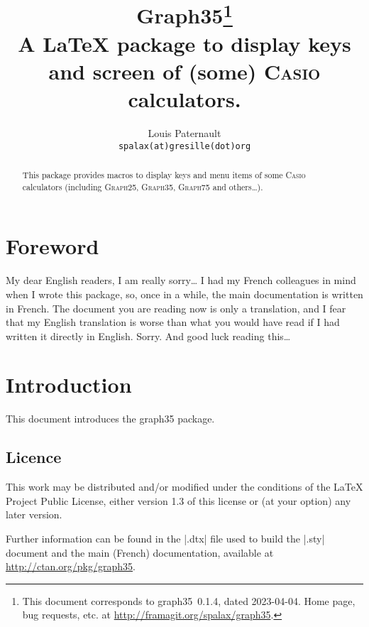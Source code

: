 \documentclass{ltxdoc}
\begin{document}
 \title{Graph35\thanks{
   This document corresponds to \textsf{graph35}~0.1.4, dated 2023-04-04.
   Home page, bug requests, etc. at \url{http://framagit.org/spalax/graph35}.
 }\\A \LaTeX{} package to display keys and screen of (some) \textsc{Casio} calculators.}
 \author{Louis Paternault\\ \texttt{spalax(at)gresille(dot)org}}

 \maketitle

 \begin{abstract}
   This package provides macros to display keys and menu items of some \textsc{Casio} calculators (including \textsc{Graph25}, \textsc{Graph35}, \textsc{Graph75} and others…).
 \end{abstract}

 \section*{Foreword}
 My dear English readers, I am really sorry… I had my French colleagues in mind when I wrote this package, so, once in a while, the main documentation is written in French. The document you are reading now is only a translation, and I fear that my English translation is worse than what you would have read if I had written it directly in English. Sorry. And good luck reading this…

 \setcounter{tocdepth}{2}
 \tableofcontents

 \section{Introduction}
 This document introduces the \textsf{graph35} package.

 \subsection{Licence}

 This work may be distributed and/or modified under the
 conditions of the \LaTeX{} Project Public License, either version 1.3
 of this license or (at your option) any later version.

 Further information can be found in the |.dtx| file used to build the |.sty| document and the main (French) documentation, available at \url{http://ctan.org/pkg/graph35}.
\end{document}

